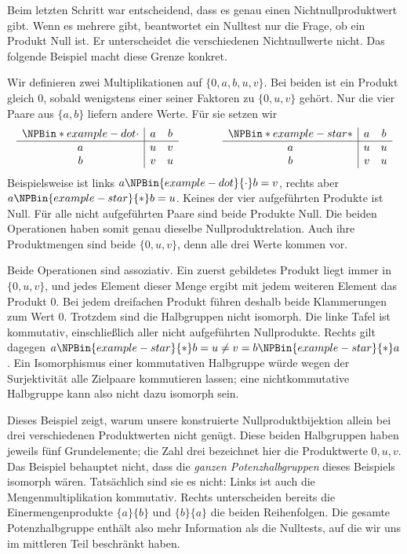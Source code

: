 Beim letzten Schritt war entscheidend, dass es genau einen
Nichtnullproduktwert gibt. Wenn es mehrere gibt, beantwortet ein
Nulltest nur die Frage, ob ein Produkt Null ist.
Er unterscheidet die verschiedenen Nichtnullwerte nicht.
Das folgende Beispiel macht diese Grenze konkret.

Wir definieren zwei Multiplikationen auf \(\{0,a,b,u,v\}\).
Bei beiden ist ein Produkt gleich \(0\), sobald wenigstens einer
seiner Faktoren zu \(\{0,u,v\}\) gehört.
Nur die vier Paare aus \(\{a,b\}\) liefern andere Werte.
Für sie setzen wir
\[
 \begin{array}{c|cc}
 \NPBin*{example-dot}{\cdot}&a&b\\\hline
 a&u&v\\
 b&v&u
 \end{array}
 \qquad\qquad
 \begin{array}{c|cc}
 \NPBin*{example-star}{\ast}&a&b\\\hline
 a&u&u\\
 b&v&u
 \end{array}
\]
Beispielsweise ist links \(a\NPBin{example-dot}{\cdot} b=v\), rechts aber \(a\NPBin{example-star}{\ast} b=u\).
Keines der vier aufgeführten Produkte ist Null.
Für alle nicht aufgeführten Paare sind beide Produkte Null.
Die beiden Operationen haben somit genau dieselbe Nullproduktrelation.
Auch ihre Produktmengen sind beide \(\{0,u,v\}\), denn alle drei
Werte kommen vor.

Beide Operationen sind assoziativ. Ein zuerst gebildetes Produkt
liegt immer in \(\{0,u,v\}\), und jedes Element dieser Menge ergibt
mit jedem weiteren Element das Produkt \(0\). Bei jedem dreifachen
Produkt führen deshalb beide Klammerungen zum Wert \(0\).
Trotzdem sind die Halbgruppen nicht isomorph.
Die linke Tafel ist kommutativ, einschließlich aller nicht
aufgeführten Nullprodukte. Rechts gilt dagegen
\(a\NPBin{example-star}{\ast} b=u\ne v=b\NPBin{example-star}{\ast} a\).
Ein Isomorphismus einer kommutativen Halbgruppe würde wegen der
Surjektivität alle Zielpaare kommutieren lassen; eine nichtkommutative
Halbgruppe kann also nicht dazu isomorph sein.

Dieses Beispiel zeigt, warum unsere konstruierte Nullproduktbijektion
allein bei drei verschiedenen Produktwerten nicht genügt.
Diese beiden Halbgruppen haben jeweils fünf Grundelemente;
die Zahl drei bezeichnet hier die Produktwerte \(0,u,v\).
Das Beispiel behauptet nicht, dass die
\emph{ganzen Potenzhalbgruppen} dieses Beispiels isomorph wären.
Tatsächlich sind sie es nicht: Links ist auch die Mengenmultiplikation
kommutativ. Rechts unterscheiden bereits die Einermengenprodukte
\(\{a\}\{b\}\) und \(\{b\}\{a\}\) die beiden Reihenfolgen.
Die gesamte Potenzhalbgruppe enthält also mehr Information als die
Nulltests, auf die wir uns im mittleren Teil beschränkt haben.

